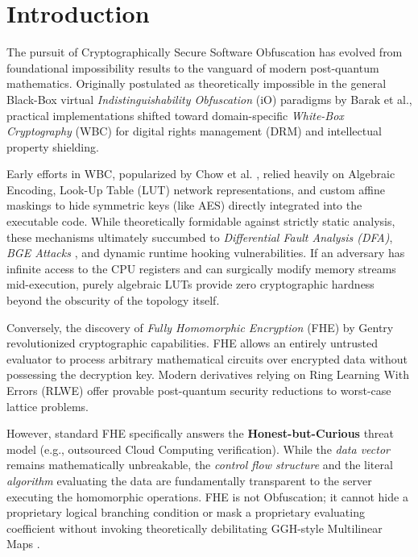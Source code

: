 \section{Introduction}
\label{sec:intro}

The pursuit of Cryptographically Secure Software Obfuscation has evolved from foundational impossibility results to the vanguard of modern post-quantum mathematics. Originally postulated as theoretically impossible in the general Black-Box virtual \textit{Indistinguishability Obfuscation} (iO) paradigms by Barak et al., practical implementations shifted toward domain-specific \textit{White-Box Cryptography} (WBC) for digital rights management (DRM) and intellectual property shielding.

Early efforts in WBC, popularized by Chow et al. \cite{chow02}, relied heavily on Algebraic Encoding, Look-Up Table (LUT) network representations, and custom affine maskings to hide symmetric keys (like AES) directly integrated into the executable code. While theoretically formidable against strictly static analysis, these mechanisms ultimately succumbed to \textit{Differential Fault Analysis (DFA)}, \textit{BGE Attacks} \cite{bge04}, and dynamic runtime hooking vulnerabilities. 
If an adversary has infinite access to the CPU registers and can surgically modify memory streams mid-execution, purely algebraic LUTs provide zero cryptographic hardness beyond the obscurity of the topology itself.

Conversely, the discovery of \textit{Fully Homomorphic Encryption} (FHE) by Gentry \cite{gentry09} revolutionized cryptographic capabilities. FHE allows an entirely untrusted evaluator to process arbitrary mathematical circuits over encrypted data without possessing the decryption key. Modern derivatives relying on Ring Learning With Errors (RLWE) \cite{bv11} offer provable post-quantum security reductions to worst-case lattice problems. 

However, standard FHE specifically answers the \textbf{Honest-but-Curious} threat model (e.g., outsourced Cloud Computing verification). While the \textit{data vector} remains mathematically unbreakable, the \textit{control flow structure} and the literal \textit{algorithm} evaluating the data are fundamentally transparent to the server executing the homomorphic operations. FHE is not Obfuscation; it cannot hide a proprietary logical branching condition or mask a proprietary evaluating coefficient without invoking theoretically debilitating GGH-style Multilinear Maps \cite{ggh13}.

